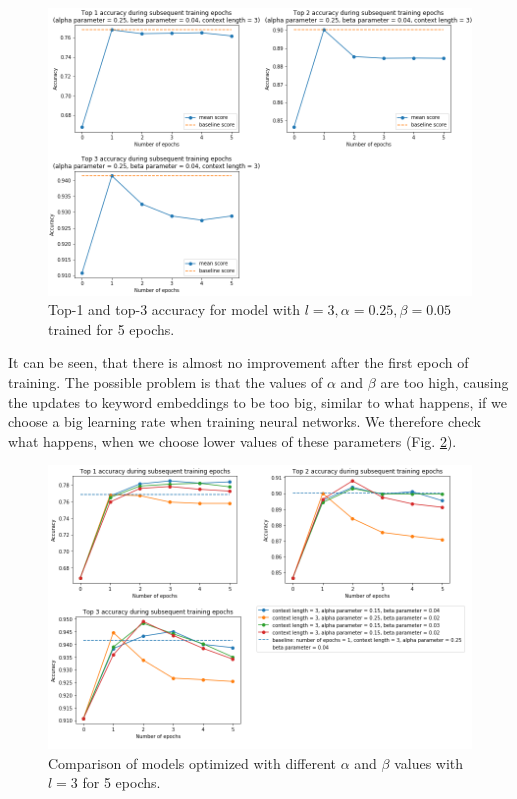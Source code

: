 \documentclass{llncs}
\begin{document}
\begin{figure}
    \centering
    \caption{Top-1 and top-3 accuracy for model with \(l=3, \alpha=0.25, \beta=0.05\) trained for 5 epochs.}
    \label{fig:exp4_1_epochs_fixed}
    \includegraphics[scale=0.65]{res/exp4_epoch_top_acc.png}
\end{figure}

It can be seen, that there is almost no improvement after the first epoch of training.
The possible problem is that the values of \(\alpha\) and \(\beta\) are too high, causing the updates to keyword embeddings to be too big, similar to what happens, if we choose a big learning rate when training neural networks.
We therefore check what happens, when we choose lower values of these parameters (Fig. \ref{fig:exp4_2_epochs_comparison}).

\begin{figure}
    \centering
    \caption{Comparison of models optimized with different \(\alpha\) and \(\beta\) values with \(l=3\) for 5 epochs.}
    \label{fig:exp4_2_epochs_comparison}
    \includegraphics[scale=0.65]{res/exp4_epoch_multiconfiguration_top_acc.png}
\end{figure}
\end{document}
